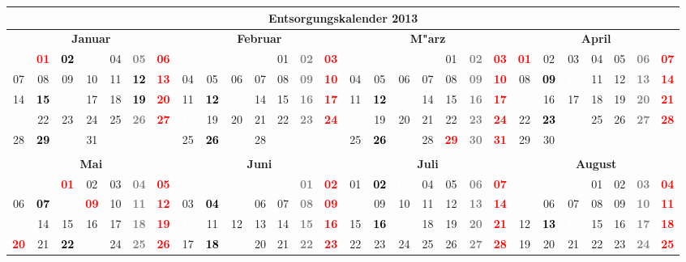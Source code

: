 \documentclass[10pt,a4paper,landscape]{article}
\newcommand{\bb}[1]{\cellcolor{MidnightBlue}\textcolor{white}{\bf #1}}
\newcommand{\gb}[1]{\cellcolor{SpringGreen}\textcolor{black}{\bf #1}}
\newcommand{\yb}[1]{\cellcolor{yellow}\textcolor{black}{\bf #1}}
\newcommand{\ob}[1]{\cellcolor{Orange}\textcolor{white}{\bf #1}}
\newcommand{\rb}[1]{\textbf{\textcolor{red}{#1}}}
\newcommand{\hv}[1]{\textbf{\textcolor{Gray}{#1}}}
\begin{document}
\begin{tabular}{|ccccccc|ccccccc|ccccccc|ccccccc|}
\hline
\multicolumn{28}{|c|}{\textbf{Entsorgungskalender 2013}} \\\hline
\multicolumn{7}{|c|}{\bf Januar} & \multicolumn{7}{|c|}{\bf Februar} & \multicolumn{7}{|c|}{\bf M"arz} & \multicolumn{7}{|c|}{\bf April} \\
& \rb{01} & \yb{02} & \ob{03} & 04 & \hv{05} & \rb{06} & & & & & 01 & \hv{02} & \rb{03} & & & & & 01 & \hv{02} & \rb{03} & \rb{01} & 02 & 03 & 04 & 05 & \hv{06} & \rb{07} \\
07 & 08 & 09 & 10 & 11 & \gb{12} & \rb{13} & 04 & 05 & 06 & 07 & 08 & \hv{09} & \rb{10} & 04 & 05 & 06 & 07 & 08 & \hv{09} & \rb{10} & 08 & \yb{09} & \ob{10} & 11 & 12 & \hv{13} & \rb{14} \\
14 & \yb{15} & \ob{16} & 17 & 18 & \gb{19} & \rb{20} & 11 & \yb{12} & \ob{13} & 14 & 15 & \hv{16} & \rb{17} & 11 & \yb{12} & \ob{13} & 14 & 15 & \hv{16} & \rb{17} & \bb{15} & 16 & 17 & 18 & 19 & \hv{20} & \rb{21} \\
\bb{21} & 22 & 23 & 24 & 25 & \hv{26} & \rb{27} & \bb{18} & 19 & 20 & 21 & 22 & \hv{23} & \rb{24} & \bb{18} & 19 & 20 & 21 & 22 & \hv{23} & \rb{24} & 22 & \yb{23} & \ob{24} & 25 & 26 & \hv{27} & \rb{28} \\
28 & \yb{29} & \ob{30} & 31 & & & & 25 & \yb{26} & \ob{27} & 28 & & & & 25 & \yb{26} & \ob{27} & 28 & \rb{29} & \hv{30} & \rb{31} & 29 & 30 &  &  &  &  &  \\
& & & & & & & & & & & & & & & & & & & & &  &  &  &  &  &  &  \\
\hline
\multicolumn{7}{|c|}{\bf Mai} & \multicolumn{7}{|c|}{\bf Juni} & \multicolumn{7}{|c|}{\bf Juli} & \multicolumn{7}{|c|}{\bf August} \\
& & \rb{01} & 02 & 03 & \hv{04} & \rb{05} & & & & & & \hv{01} & \rb{02} & 01 & \yb{02} & \ob{03} & 04 & 05 & \hv{06} & \rb{07} & & & & 01 & 02 & \hv{03} & \rb{04} \\
06 & \yb{07} & \ob{08} & \rb{09} & 10 & \hv{11} & \rb{12} & 03 & \yb{04} & \ob{05} & 06 & 07 & \hv{08} & \rb{09} & \bb{08} & 09 & 10 & 11 & 12 & \hv{13} & \rb{14} & \bb{05} & 06 & 07 & 08 & 09 & \hv{10} & \rb{11} \\
\bb{13} & 14 & 15 & 16 & 17 & \hv{18} & \rb{19} & \bb{10} & 11 & 12 & 13 & 14 & \hv{15} & \rb{16} & 15 & \yb{16} & \ob{17} & 18 & 19 & \hv{20} & \rb{21} & 12 & \yb{13} & \ob{14} & 15 & 16 & \hv{17} & \rb{18} \\
\rb{20} & 21 & \yb{22} & \ob{23} & 24 & \hv{25} & \rb{26} & 17 & \yb{18} & \ob{19} & 20 & 21 & \hv{22} & \rb{23} & 22 & 23 & 24 & 25 & 26 & \hv{27} & \rb{28} & 19 & 20 & 21 & 22 & 23 & \hv{24} & \rb{25} \\

\end{tabular}
\end{document}
